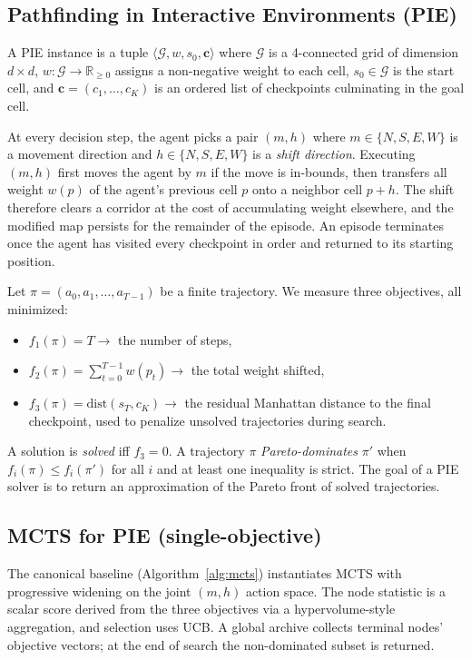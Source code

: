 \subsection{Pathfinding in Interactive Environments (PIE)}
\label{sec:problem}

A PIE instance is a tuple $\langle \mathcal{G}, w, s_0, \mathbf{c}\rangle$ where $\mathcal{G}$ is a 4-connected grid of dimension $d \times d$, $w : \mathcal{G} \to \mathbb{R}_{\geq 0}$ assigns a non-negative weight to each cell, $s_0 \in \mathcal{G}$ is the start cell, and $\mathbf{c} = (c_1, \dots, c_K)$ is an ordered list of checkpoints culminating in the goal cell.

At every decision step, the agent picks a pair $(m, h)$ where $m \in \{N, S, E, W\}$ is a movement direction and $h \in \{N, S, E, W\}$ is a \emph{shift direction}. Executing $(m, h)$ first moves the agent by $m$ if the move is in-bounds, then transfers all weight $w(p)$ of the agent's previous cell $p$ onto a neighbor cell $p + h$. The shift therefore clears a corridor at the cost of accumulating weight elsewhere, and the modified map persists for the remainder of the episode. An episode terminates once the agent has visited every checkpoint in order and returned to its starting position.

Let $\pi = (a_0, a_1, \dots, a_{T-1})$ be a finite trajectory. We measure three objectives, all minimized:
\begin{itemize}
    \item $f_1(\pi) = T \rightarrow$ the number of steps,
    \item $f_2(\pi) = \sum_{t=0}^{T-1} w(p_t) \rightarrow$ the total weight shifted,
    \item $f_3(\pi) = \mathrm{dist}(s_T, c_K) \rightarrow$ the residual Manhattan distance to the final checkpoint, used to penalize unsolved trajectories during search.
\end{itemize}
A solution is \emph{solved} iff $f_3 = 0$. A trajectory $\pi$ \emph{Pareto-dominates} $\pi'$ when $f_i(\pi) \leq f_i(\pi')$ for all $i$ and at least one inequality is strict. The goal of a PIE solver is to return an approximation of the Pareto front of solved trajectories.

\newpage
\subsection{MCTS for PIE (single-objective)}
The canonical baseline (Algorithm~\ref{alg:mcts}) instantiates MCTS with progressive widening on the joint $(m,h)$ action space. The node statistic is a scalar score derived from the three objectives via a hypervolume-style aggregation, and selection uses UCB. A global archive collects terminal nodes' objective vectors; at the end of search the non-dominated subset is returned.

